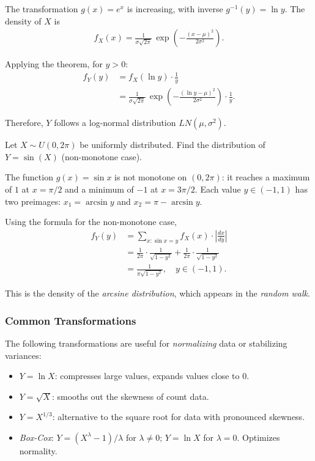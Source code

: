 \begin{solucion}
The transformation $g(x) = e^x$ is increasing, with inverse $g^{-1}(y) = \ln y$. The density of $X$ is
\begin{align}
 f_X(x) = \frac{1}{\sigma\sqrt{2\pi}}\,\exp\!\left(-\frac{(x-\mu)^2}{2\sigma^2}\right).
\end{align}

Applying the theorem, for $y > 0$:
\begin{align}
 f_Y(y) &= f_X(\ln y) \cdot \frac{1}{y} \\
 &= \frac{1}{\sigma\sqrt{2\pi}}\,\exp\!\left(-\frac{(\ln y - \mu)^2}{2\sigma^2}\right) \cdot \frac{1}{y}.
\end{align}

Therefore, $Y$ follows a log-normal distribution $LN(\mu, \sigma^2)$.
\end{solucion}

\begin{ejemplo}
 \label{exmp:3.2.4}
Let $X \sim U(0, 2\pi)$ be uniformly distributed. Find the distribution of $Y = \sin(X)$ (non-monotone case).
\end{ejemplo}

\begin{solucion}
The function $g(x) = \sin x$ is not monotone on $(0, 2\pi)$: it reaches a maximum of $1$ at $x = \pi/2$ and a minimum of $-1$ at $x = 3\pi/2$. Each value $y \in (-1, 1)$ has two preimages: $x_1 = \arcsin y$ and $x_2 = \pi - \arcsin y$.

Using the formula for the non-monotone case,
\begin{align}
 f_Y(y) &= \sum_{x: \sin x = y} f_X(x) \cdot \left|\frac{dx}{dy}\right| \\
 &= \frac{1}{2\pi}\cdot\frac{1}{\sqrt{1-y^2}} + \frac{1}{2\pi}\cdot\frac{1}{\sqrt{1-y^2}} \\
 &= \frac{1}{\pi\sqrt{1-y^2}}, \quad y \in (-1, 1).
\end{align}

This is the density of the \emph{arcsine distribution}, which appears in the \emph{random walk}.
\end{solucion}

\subsubsection{Common Transformations}

\begin{observacion}
The following transformations are useful for \emph{normalizing} data or stabilizing variances:
\begin{itemize}
 \item $Y = \ln X$: compresses large values, expands values close to $0$.
 \item $Y = \sqrt{X}$: smooths out the skewness of count data.
 \item $Y = X^{1/3}$: alternative to the square root for data with pronounced skewness.
 \item \emph{Box-Cox}: $Y = (X^\lambda - 1)/\lambda$ for $\lambda \neq 0$; $Y = \ln X$ for $\lambda = 0$. Optimizes normality.
\end{itemize}
\end{observacion}

